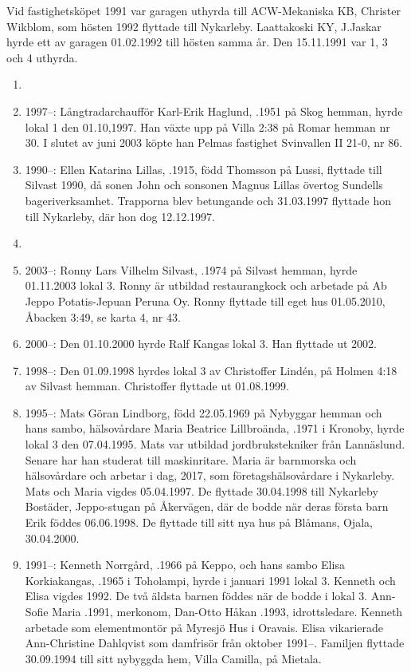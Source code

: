 Vid fastighetsköpet 1991 var garagen uthyrda till ACW-Mekaniska KB, Christer Wikblom, som hösten 1992 flyttade till Nykarleby. Laattakoski KY, J.Jaskar hyrde ett av garagen 01.02.1992 till hösten samma år. Den 15.11.1991 var 1, 3 och 4 uthyrda.
\begin{enumerate}
  \item {}
  \item 1997--: Långtradarchaufför Karl-Erik Haglund, .1951 på Skog hemman, hyrde lokal 1 den 01.10,1997. Han växte upp på Villa 2:38 på Romar hemman nr 30. I slutet av juni 2003 köpte han Pelmas fastighet Svinvallen II 21-0, nr 86.
  \item 1990--: Ellen Katarina Lillas, .1915, född Thomsson på Lussi, flyttade till Silvast 1990, då sonen John och sonsonen Magnus Lillas övertog Sundells bageriverksamhet. Trapporna blev betungande och 31.03.1997	flyttade hon till Nykarleby, där hon dog 12.12.1997.
  \item {}
  \item 2003--: Ronny Lars Vilhelm Silvast, .1974 på Silvast hemman, hyrde	01.11.2003 lokal 3. Ronny är utbildad restaurangkock och arbetade på Ab Jeppo Potatis-Jepuan Peruna Oy. Ronny flyttade till eget hus 01.05.2010, Åbacken 3:49, se karta 4, nr 43.
  \item 2000--: Den 01.10.2000 hyrde Ralf Kangas lokal 3. Han flyttade ut 2002.
  \item 1998--: Den 01.09.1998 hyrdes lokal 3 av Christoffer Lindén,  på	Holmen 4:18 av Silvast hemman. Christoffer flyttade ut 01.08.1999.
  \item 1995--: Mats Göran Lindborg, född 22.05.1969 på Nybyggar hemman och hans	sambo, hälsovårdare Maria Beatrice Lillbroända, .1971 i Kronoby, hyrde lokal 3 den 07.04.1995. Mats var utbildad jordbrukstekniker från Lannäslund. Senare har han studerat till maskinritare. Maria är barnmorska och hälsovårdare och arbetar i dag, 	2017, som företagshälsovårdare i Nykarleby. Mats och Maria vigdes 05.04.1997. De flyttade 30.04.1998 till Nykarleby Bostäder, Jeppo-stugan på Åkervägen, där de bodde när deras första barn Erik föddes 06.06.1998. De flyttade till sitt nya hus på Blåmans, Ojala, 30.04.2000.
  \item 1991--: Kenneth Norrgård, .1966 på Keppo, och hans sambo Elisa	Korkiakangas, .1965 i Toholampi, hyrde i januari 1991 lokal 3. Kenneth och Elisa vigdes 1992. De två äldsta barnen föddes när de bodde i lokal 3. Ann-Sofie Maria	.1991, merkonom,	Dan-Otto Håkan	.1993, idrottsledare. Kenneth arbetade som elementmontör på Myresjö Hus i Oravais. Elisa	vikarierade Ann-Christine Dahlqvist som damfrisör från oktober 1991--. Familjen flyttade 30.09.1994 till sitt nybyggda hem, Villa Camilla, på Mietala.

\end{enumerate}
